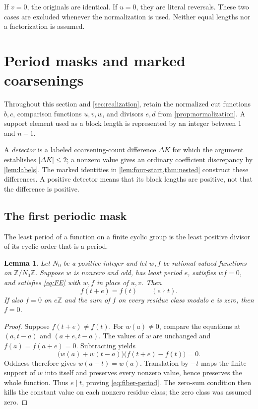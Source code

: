 \documentclass[11pt,a4paper]{amsart}
\numberwithin{equation}{section}
\theoremstyle{plain}
\newtheorem{lemma}[theorem]{Lemma}
\theoremstyle{definition}
\newcommand{\Z}{\mathbb Z}
\begin{document}
If \(v=0\), the originals are identical.  If \(u=0\), they are literal
reversals.  These two cases are excluded whenever the normalization is used.
Neither equal lengths nor a factorization is assumed.

\section{Period masks and marked coarsenings}\label{sec:detector}

Throughout this section and \cref{sec:realization}, retain the normalized
cut functions \(b,c\), comparison functions \(u,v,w\), and divisors
\(e,d\) from \cref{prop:normalization}.  A support element used as a
block length is represented by an integer between \(1\) and \(n-1\).

A \emph{detector} is a labeled coarsening-count difference \(\Delta K\)
for which the argument establishes \(|\Delta K|\le2\); a nonzero value
gives an ordinary coefficient discrepancy by \cref{lem:labels}.
The marked identities in \cref{lem:four-start,thm:nested} construct these
differences.  A positive detector means that its block lengths are positive,
not that the difference is positive.

\subsection{The first periodic mask}
The least period of a function on a finite cyclic group is the least
positive divisor of its cyclic order that is a period.

\begin{lemma}\label{lem:fiber}
Let \(N_0\) be a positive integer and let \(w,f\) be rational-valued functions
on \(\Z/N_0\Z\).
Suppose \(w\) is nonzero and odd, has least period \(e\), satisfies \(wf=0\),
and satisfies \eqref{eq:FE} with \(w,f\) in place of \(u,v\).  Then
\begin{equation}\label{eq:fiber-period}
f(t+e)=f(t)\qquad(e\nmid t).
\end{equation}
If also \(f=0\) on \(e\Z\) and the sum of \(f\) on every residue class modulo
\(e\) is zero, then \(f=0\).
\end{lemma}
\begin{proof}
Suppose \(f(t+e)\ne f(t)\).  For \(w(a)\ne0\), compare the equations at
\((a,t-a)\) and \((a+e,t-a)\).  The values of \(w\) are unchanged and
\(f(a)=f(a+e)=0\).  Subtracting yields
\[
\bigl(w(a)+w(t-a)\bigr)\bigl(f(t+e)-f(t)\bigr)=0.
\]
Oddness therefore gives \(w(a-t)=w(a)\).  Translation by \(-t\) maps the finite
support of \(w\) into itself and preserves every nonzero value, hence
preserves the whole function.  Thus \(e\mid t\), proving
\eqref{eq:fiber-period}.  The zero-sum condition then kills the constant
value on each nonzero residue class; the zero class was assumed zero.
\end{proof}
\end{document}
